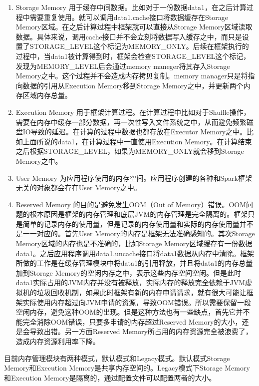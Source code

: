 \begin{enumerate}
    \item Storage Memory 用于缓存中间数据。比如对于一份数据data1，在之后计算过程中需要重复使用。就可以调用data1.cache接口将数据缓存在Storage Memory区域。在之后计算过程中框架就可以直接从Storage Memory区域读取数据。具体来说，调用cache接口并不会立刻将数据写入缓存之中，而只是设置了STORAGE\_LEVEL这个标记为MEMORY\_ONLY。后续在框架执行的过程中，当data1被计算得到时，框架会检查STORAGE\_LEVEL这个标记，发现为MEMORY\_LEVEL后会通过memory maneger将其存入Storage Memory之中。这个过程并不会造成内存拷贝复制。memory manager只是将指向数据的引用从Execution Memory移到Storage Memory之中，并更新两个内存区域内存总量。
    
    \item Execution Memory 用于框架计算过程。在计算过程中比如对于Shuffle操作，需要在内存中缓存一部分数据，再一次性写入文件系统之中，从而避免频繁磁盘IO导致的延迟。在计算的过程中数据也都存放在Executor Memory之中。比如上面所说的data1，在计算过程中一直使用Execution Memory。在计算结束之后根据STORAGE\_LEVEL，如果为MEMORY\_ONLY就会移到Storage Memory之中。
    
    \item User Memory 为应用程序使用的内存空间。应用程序创建的各种和Spark框架无关的对象都会存在User Memory之中。
    
    \item Reserved Memory 的目的是避免发生OOM（Out of Memory）错误。OOM问题的根本原因是框架的内存管理和底层JVM的内存管理是完全隔离的。框架只是简单的记录内存的使用量，但是记录的内存使用量和实际的内存使用量并不是一一对应的。首先User Memory的内存是框架无法准确感知的。其次Storage Memory区域的内存也是不准确的，比如Storage Memory区域缓存有一份数据data1。之后应用程序调用data1.uncache接口将data1数据从内存中清除。框架所做的工作是在缓存管理模块中将data1的引用释放，并且将data1的内存总量加到Storage Memory的空闲内存之中，表示这些内存空间空闲。但是此时data1实际占用的JVM内存并没有被释放，实际内存的释放完全依赖于JVM虚拟机的垃圾回收机制，如果此时框架有新的内存申请请求，就有很大可能让框架实际使用内存超过向JVM申请的资源，导致OOM错误。所以需要保留一段空闲内存，避免这种OOM的出现。但是这种方法也有一些缺点，首先它并不能完全消除OOM错误，只要多申请的内存超过Reserved Memory的大小，还是会导致出错。另一方面Reserved Memory所占用的内存资源完全被浪费了，造成内存资源利用率下降。
\end{enumerate}

目前内存管理模块有两种模式，默认模式和Legacy模式。默认模式Storage Memory和Execution Memory是共享内存空间的。Legacy模式下Storage Memory和Execution Memory是隔离的，通过配置文件可以配置两者的大小。

